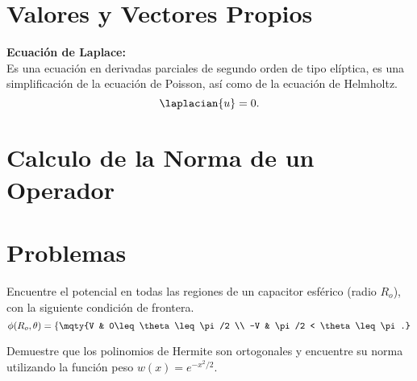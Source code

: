 \section*{Valores y Vectores Propios}




\begin{mdframed}[style=warning]
	{\Large \textbf{Ecuación de Laplace:}} \\
	Es una ecuación en derivadas parciales de segundo orden de tipo elíptica, es una simplificación de la ecuación de Poisson, así como de la ecuación de Helmholtz.
		$$ \laplacian{u} = 0. $$
\end{mdframed}




\section*{Calculo de la Norma de un Operador}






\pagebreak


\section*{Problemas}


\begin{ejercicio}
	Encuentre el potencial en todas las regiones de un capacitor esférico (radio $R_o$), con la siguiente condición de frontera.
		$$ \phi (R_o ,\theta) = \left\{ \mqty{V & 0\leq \theta \leq \pi /2 \\ -V & \pi/2 < \theta \leq \pi.} \right. $$
\end{ejercicio}












\begin{ejercicio}
	Demuestre que los polinomios de Hermite son ortogonales y encuentre su norma utilizando la función peso $w(x) = e^{-x^2 /2}$.
\end{ejercicio}














